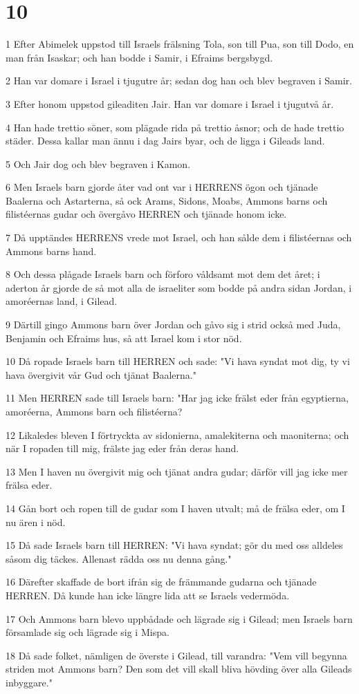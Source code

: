 \chapter{10}

\par 1 Efter Abimelek uppstod till Israels frälsning Tola, son till Pua, son till Dodo, en man från Isaskar; och han bodde i Samir, i Efraims bergsbygd.
\par 2 Han var domare i Israel i tjugutre år; sedan dog han och blev begraven i Samir.
\par 3 Efter honom uppstod gileaditen Jair. Han var domare i Israel i tjugutvå år.
\par 4 Han hade trettio söner, som plägade rida på trettio åsnor; och de hade trettio städer. Dessa kallar man ännu i dag Jairs byar, och de ligga i Gileads land.
\par 5 Och Jair dog och blev begraven i Kamon.
\par 6 Men Israels barn gjorde åter vad ont var i HERRENS ögon och tjänade Baalerna och Astarterna, så ock Arams, Sidons, Moabs, Ammons barns och filistéernas gudar och övergåvo HERREN och tjänade honom icke.
\par 7 Då upptändes HERRENS vrede mot Israel, och han sålde dem i filistéernas och Ammons barns hand.
\par 8 Och dessa plågade Israels barn och förforo våldsamt mot dem det året; i aderton år gjorde de så mot alla de israeliter som bodde på andra sidan Jordan, i amoréernas land, i Gilead.
\par 9 Därtill gingo Ammons barn över Jordan och gåvo sig i strid också med Juda, Benjamin och Efraims hus, så att Israel kom i stor nöd.
\par 10 Då ropade Israels barn till HERREN och sade: "Vi hava syndat mot dig, ty vi hava övergivit vår Gud och tjänat Baalerna."
\par 11 Men HERREN sade till Israels barn: "Har jag icke frälst eder från egyptierna, amoréerna, Ammons barn och filistéerna?
\par 12 Likaledes bleven I förtryckta av sidonierna, amalekiterna och maoniterna; och när I ropaden till mig, frälste jag eder från deras hand.
\par 13 Men I haven nu övergivit mig och tjänat andra gudar; därför vill jag icke mer frälsa eder.
\par 14 Gån bort och ropen till de gudar som I haven utvalt; må de frälsa eder, om I nu ären i nöd.
\par 15 Då sade Israels barn till HERREN: "Vi hava syndat; gör du med oss alldeles såsom dig täckes. Allenast rädda oss nu denna gång."
\par 16 Därefter skaffade de bort ifrån sig de främmande gudarna och tjänade HERREN. Då kunde han icke längre lida att se Israels vedermöda.
\par 17 Och Ammons barn blevo uppbådade och lägrade sig i Gilead; men Israels barn församlade sig och lägrade sig i Mispa.
\par 18 Då sade folket, nämligen de överste i Gilead, till varandra: "Vem vill begynna striden mot Ammons barn? Den som det vill skall bliva hövding över alla Gileads inbyggare."

